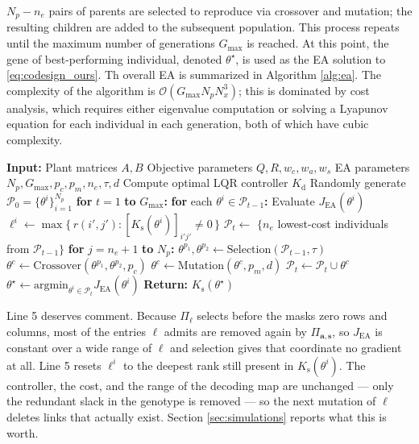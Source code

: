\documentclass[letterpaper, 10pt, conference]{ieeeconf}
\begin{document}
$N_p - n_e$ pairs of parents are selected to reproduce via crossover and mutation; the resulting children are added to the subsequent population. This process repeats until the maximum number of generations $G_{\max}$ is reached. At this point, the gene of best-performing individual, denoted $\theta^\star$, is used as the EA solution to \eqref{eq:codesign_ours}. Th overall EA is summarized in Algorithm \ref{alg:ea}. The complexity of the algorithm is $\mathcal{O}(G_{\max} N_p N_x^3)$; this is dominated by cost analysis, which requires either eigenvalue computation or solving a Lyapunov equation for each individual in each generation, both of which have cubic complexity.

\begin{algorithm}[t]
\caption{EA-Based Sparse LQR Controller Co-Design}
\label{alg:ea}
\begin{algorithmic}[1]
\Statex \textbf{Input:} 
\Statex \quad Plant matrices $A, B$
\Statex \quad Objective parameters $Q, R, w_c, w_a, w_s$
\Statex \quad EA parameters $N_p, G_{\max}, p_c, p_m, n_e, \tau, d$ 
\State Compute optimal LQR controller $K_\mathrm{d}$
\State Randomly generate $\mathcal{P}_0 = \{\theta^i\}_{i=1}^{N_p}$
\State \textbf{for} $t = 1$ \textbf{to} $G_{\max}$\textbf{:} 
\State \quad \textbf{for} each $\theta^i \in \mathcal{P}_{t-1}$\textbf{:}
\State \quad \quad Evaluate $J_\mathrm{EA}(\theta^i)$
\State \quad \quad $\ell^i \gets \max\{\,r(i',j') : [K_\mathrm{s}(\theta^i)]_{i'j'} \neq 0\,\}$
\State $\mathcal{P}_{t} \gets$ $\{n_e$ lowest-cost individuals from $\mathcal{P}_{t-1}\}$
\State \textbf{for} $j = n_e + 1$ \textbf{to} $N_p$\textbf{:}
\State \quad $\theta^{p_1}, \theta^{p_2} \gets \text{Selection}(\mathcal{P}_{t-1}, \tau)$
\State \quad $\theta^c \gets \text{Crossover}(\theta^{p_1}, \theta^{p_2}, p_c)$
\State \quad $\theta^c \gets \text{Mutation}(\theta^c, p_m, d)$
\State \quad $\mathcal{P}_{t} \gets \mathcal{P}_{t} \cup \theta^c$
\State $\theta^\star \leftarrow \mathrm{argmin}_{\theta^i \in \mathcal{P}_t}J_\mathrm{EA}(\theta^i)$
\Statex \textbf{Return:} $K_\mathrm{s}(\theta^\star)$
\end{algorithmic}
\end{algorithm}

Line 5 deserves comment. Because $\Pi_\ell$ selects before the masks zero rows
and columns, most of the entries $\ell$ admits are removed again by
$\Pi_{\mathbf{a},\mathbf{s}}$, so $J_\mathrm{EA}$ is constant over a wide range
of $\ell$ and selection gives that coordinate no gradient at all. Line 5 resets
$\ell^i$ to the deepest rank still present in $K_\mathrm{s}(\theta^i)$. The
controller, the cost, and the range of the decoding map are unchanged --- only
the redundant slack in the genotype is removed --- so the next mutation of
$\ell$ deletes links that actually exist. Section \ref{sec:simulations} reports
what this is worth.
\end{document}
